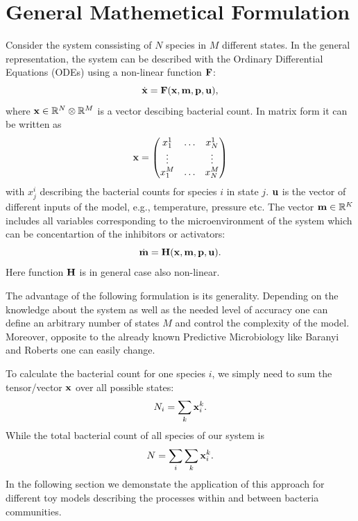 \documentclass[10pt,A4paper]{article}
\begin{document}
\section{General Mathemetical Formulation}
Consider the system conssisting of $N$ species in $M$ different states.
In the general representation, the system can be described with the Ordinary Differential Equations (ODEs) using a non-linear function $\mathbf{F}$:
\begin{equation}
   \dot{\mathbf{x}} = \mathbf{F}(\mathbf{x}, \mathbf{m}, \mathbf{p}, \mathbf{u}),
   \label{eq:model_ODE}
\end{equation}
where  $\mathbf{x} \in \mathbb{R}^{N}  \otimes \mathbb{R}^{M}$ is a vector descibing bacterial count.
In matrix form it can be written as
\begin{equation}
    \mathbf{x} = \begin{pmatrix}
        x^1_1  & \dots & x^1_N  \\
        \vdots &       & \vdots \\
        x^M_1  & \dots & x^M_N  \\
            \end{pmatrix}
    \label{eq:model_bact}
\end{equation}
with $x_{j}^{i}$ describing the bacterial counts for species $i$ in state $j$.
$\mathbf{u}$ is the vector of different inputs of the model, e.g., temperature, pressure etc.
The vector $\mathbf{m} \in \mathbb{R}^{K}$ includes all variables corresponding to the microenvironment of the system which can be concentartion of the inhibitors or activators:
\begin{equation}
    \dot{\mathbf{m}} = \mathbf{H} (\mathbf{x}, \mathbf{m}, \mathbf{p}, \mathbf{u}).
    \label{eq:model_microenv}
\end{equation}
Here function $\mathbf{H}$ is in general case also non-linear.

The advantage of the following formulation is its generality. 
Depending on the knowledge about the system as well as the needed level of accuracy one can define an arbitrary number of states $M$ and control the complexity of the model.
Moreover, opposite to the already known Predictive Microbiology like Baranyi and Roberts one can easily change.

To calculate the bacterial count for one species $i$, we simply need to sum the tensor/vector $\mathbf{x}$ over all possible states:
\begin{equation}
    N_i = \sum_k \mathbf{x}_i^k.
\end{equation}
While the total bacterial count of all species of our system is
\begin{equation}
    N = \sum_i \sum_k \mathbf{x}_i^k.
\end{equation}
In the following section we demonstate the application of this approach for different toy models describing the processes within and between bacteria communities.
\end{document}
